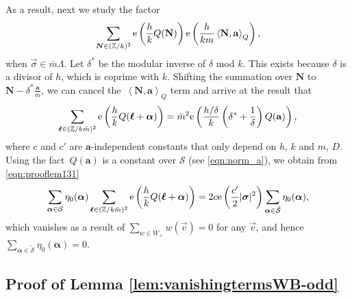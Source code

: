\documentclass[pdftex]{sigma}
\def\CS{\mathcal{S}}
\def\ss{ \tilde{\mathcal{S}} }
\newcommand{\ZZ}{\mathbb{Z}}
\def\bal{\boldsymbol{\alpha}}
\def\bol{\boldsymbol{\ell}}
\def\ex{{\rm e}}
\theoremstyle{definition}
\numberwithin{equation}{section}
\begin{document}
As a result, next we study the factor
\[\sum_{\boldsymbol{N}\in (\ZZ/k)^2 } \ex\left(\frac{h}{k}Q(\mathbf{N})\right) \ex\left(\frac{h}{km}\left<\mathbf{N},\mathbf{a}\right>_Q\right),\]
 when $\vec \sigma \in \bar m \Lambda$. Let $\delta^*$ be the modular inverse of $\delta$ mod $k$. This exists because $\delta$ is a divisor of $h$, which is coprime with $k$. Shifting the summation over ${\boldsymbol N}$ to ${\boldsymbol N}-\delta^*{\frac{\mathbf{a}}{\bar m}} $, we can cancel the~$\left<\mathbf{N},\mathbf{a}\right>_Q$ term and arrive at the result that
\[
\sum_{\boldsymbol{\ell}\in (\ZZ/k\bar m)^2 }\ex\left(\frac{h}{k}Q(\bol+\bal)\right) = \bar m^2 \ex\left( {\frac{h/\delta}{k}}\left(\delta^\ast+{\frac{1}{\delta}}\right) Q(\mathbf{a})\right),
\]
where $c$ and $c'$ are $\mathbf{a}$-independent constants that only depend on $h$, $k$ and $m$, $D$. Using the fact~$Q(\mathbf{a})$ is a constant over $\CS$ (see \eqref{eqn:norm_a}), we obtain from \eqref{eqn:prooflem131}
\begin{equation*}
\sum_{\bal\in\CS} \eta_0(\bal) \sum_{\boldsymbol{\ell}\in (\ZZ/k\bar m)^2 }\ex\left(\frac{h}{k}Q(\bol+\bal)\right)
= 2 c \ex\left( {\frac{c'}{2}}|\boldsymbol{\sigma}|^2 \right) \sum_{\bal\in\ss}\eta_0 (\bal),
\end{equation*}
which vanishes as a result of $\sum_{w\in W_+} w(\vec v) =0$ for any $\vec v$, and hence $ \sum_{\bal\in\ss}\eta_0 (\bal)=0$.

\subsection{Proof of Lemma \ref{lem:vanishingtermsWB-odd}}
\label{pf_lem:vanishingtermsWB-odd}
\end{document}
